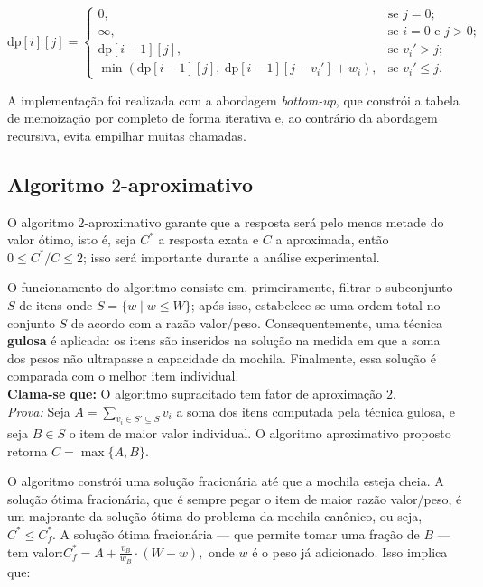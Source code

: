 \documentclass[12pt]{article}
\begin{document}
\[
\text{dp}[i][j] = 
\begin{cases}
0, & \text{se } j = 0;\\
\infty, & \text{se } i = 0 \text{ e } j > 0;\\
\text{dp}[i-1][j], & \text{se } v_i' > j;\\
\min\left(\text{dp}[i-1][j],\ \text{dp}[i-1][j - v_i'] + w_i\right), & \text{se } v_i' \leq j.
\end{cases}
\]

A implementação foi realizada com a abordagem \textit{bottom-up}, que constrói a tabela de memoização por completo de forma iterativa e, ao contrário da abordagem recursiva, evita empilhar muitas chamadas.


\subsection{Algoritmo \(2\)-aproximativo}

O algoritmo \(2\)-aproximativo garante que a resposta será pelo menos metade do valor ótimo, isto é, seja \(C^*\) a resposta exata e \(C\) a aproximada, então \(0 \leq C^*/C \leq 2\); isso será importante durante a análise experimental.

O funcionamento do algoritmo consiste em, primeiramente, filtrar o subconjunto \(S\) de itens onde \(S = \{w \mid w \leq W\}\); após isso, estabelece-se uma ordem total no conjunto \(S\) de acordo com a razão valor/peso. Consequentemente, uma técnica \textbf{gulosa} é aplicada: os itens são inseridos na solução na medida em que a soma dos pesos não ultrapasse a capacidade da mochila. Finalmente, essa solução é comparada com o melhor item individual.\\
\textbf{Clama-se que:} O algoritmo supracitado tem fator de aproximação \(2\).\\
\textit{Prova:} Seja \(A = \sum_{v_i \in S' \subseteq S} v_i\) a soma dos itens computada pela técnica gulosa, e seja \(B \in S\) o item de maior valor individual. O algoritmo aproximativo proposto retorna \(C = \max\{A, B\}\).

O algoritmo constrói uma solução fracionária até que a mochila esteja cheia. A solução ótima fracionária, que é sempre pegar o item de maior razão valor/peso, é um majorante da solução ótima do problema da mochila canônico, ou seja, \(C^* \leq C_f^*\). A solução ótima fracionária — que permite tomar uma fração de \(B\) — tem valor:\(C_f^* = A + \frac{v_B}{w_B} \cdot (W - w),\) onde \(w\) é o peso já adicionado. Isso implica que:
\end{document}
